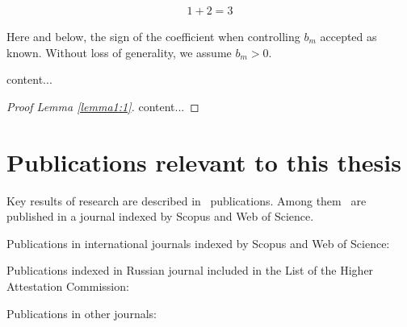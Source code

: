 \begin{align} %
	1+2=3
\end{align}

\begin{assumption-syn-en}
	Here and below, the sign of the coefficient when controlling $b_m$
	accepted as known. Without loss of generality, we assume $b_m >0$.
\end{assumption-syn-en}
\begin{lemma-syn-en} \label{lemma1:1}
	content...
\end{lemma-syn-en}

\begin{proof}[Proof Lemma \ref{lemma1:1}]
	content...
\end{proof}

\section*{Publications relevant to this thesis}
Key results of research are described in \theAllMyPapers~publications. Among them \theScopusPapers~are published in a journal indexed by Scopus and Web of Science. 

Publications in international journals indexed by Scopus and Web of Science:
\printPapperScopus

Publications indexed in Russian journal included in the List of the Higher Attestation Commission: 

Publications in other journals:
\printPapperOther
